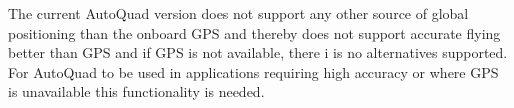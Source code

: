 The current AutoQuad version does not support any other source of global positioning than the onboard GPS and thereby does not support accurate flying better than GPS and if GPS is not available, there i is no alternatives supported. For AutoQuad to be used in applications requiring high accuracy or where GPS is unavailable this functionality is needed. \\
